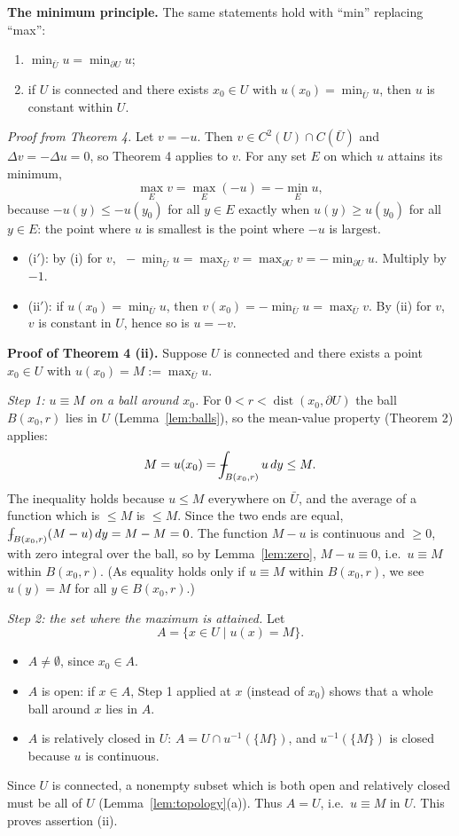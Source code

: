 \documentclass[11pt]{article}
\def\Xint#1{\mathchoice
  {\XXint\displaystyle\textstyle{#1}}%
  {\XXint\textstyle\scriptstyle{#1}}%
  {\XXint\scriptstyle\scriptscriptstyle{#1}}%
  {\XXint\scriptscriptstyle\scriptscriptstyle{#1}}%
  \!\int}
\def\XXint#1#2#3{{\setbox0=\hbox{$#1{#2#3}{\int}$}
  \vcenter{\hbox{$#2#3$}}\kern-.5\wd0}}
\def\fint{\Xint-}
\theoremstyle{plain}
\theoremstyle{definition}
\theoremstyle{remark}
\begin{document}
\textbf{The minimum principle.} The same statements hold with ``min'' replacing ``max'':
\begin{enumerate}
    \item[(i$'$)] $\displaystyle\min_{\bar U} u = \min_{\partial U} u$;
    \item[(ii$'$)] if $U$ is connected and there exists $x_0 \in U$ with $u(x_0) = \min_{\bar U} u$, then $u$ is constant within $U$.
\end{enumerate}
\emph{Proof from Theorem 4.} Let $v = -u$. Then $v \in C^2(U)\cap C(\bar U)$ and $\Delta v = -\Delta u = 0$, so Theorem 4 applies to $v$. For any set $E$ on which $u$ attains its minimum,
$$ \max_E v = \max_E(-u) = -\min_E u, $$
because $-u(y) \leq -u(y_0)$ for all $y \in E$ exactly when $u(y) \geq u(y_0)$ for all $y \in E$: the point where $u$ is smallest is the point where $-u$ is largest.
\begin{itemize}
    \item (i$'$): by (i) for $v$, $\;-\min_{\bar U} u = \max_{\bar U} v = \max_{\partial U} v = -\min_{\partial U} u$. Multiply by $-1$.
    \item (ii$'$): if $u(x_0) = \min_{\bar U} u$, then $v(x_0) = -\min_{\bar U} u = \max_{\bar U} v$. By (ii) for $v$, $v$ is constant in $U$, hence so is $u = -v$.
\end{itemize}

\textbf{Proof of Theorem 4 (ii).} Suppose $U$ is connected and there exists a point $x_0 \in U$ with $u(x_0) = M := \max_{\bar U} u$.

\emph{Step 1: $u \equiv M$ on a ball around $x_0$.} For $0 < r < \operatorname{dist}(x_0, \partial U)$ the ball $B(x_0,r)$ lies in $U$ (Lemma~\ref{lem:balls}), so the mean-value property (Theorem 2) applies:
$$ M = u(x_0) = \fint_{B(x_0,r)} u\, dy \leq M. $$
The inequality holds because $u \leq M$ everywhere on $\bar U$, and the average of a function which is $\leq M$ is $\leq M$. Since the two ends are equal, $\fint_{B(x_0,r)} (M - u)\, dy = M - M = 0$. The function $M - u$ is continuous and $\geq 0$, with zero integral over the ball, so by Lemma~\ref{lem:zero}, $M - u \equiv 0$, i.e.\ $u \equiv M$ within $B(x_0,r)$. (As equality holds only if $u \equiv M$ within $B(x_0,r)$, we see $u(y) = M$ for all $y \in B(x_0,r)$.)

\emph{Step 2: the set where the maximum is attained.} Let
$$ A = \{ x \in U \mid u(x) = M \}. $$
\begin{itemize}
    \item $A \neq \emptyset$, since $x_0 \in A$.
    \item $A$ is open: if $x \in A$, Step 1 applied at $x$ (instead of $x_0$) shows that a whole ball around $x$ lies in $A$.
    \item $A$ is relatively closed in $U$: $A = U \cap u^{-1}(\{M\})$, and $u^{-1}(\{M\})$ is closed because $u$ is continuous.
\end{itemize}
Since $U$ is connected, a nonempty subset which is both open and relatively closed must be all of $U$ (Lemma~\ref{lem:topology}(a)). Thus $A = U$, i.e.\ $u \equiv M$ in $U$. This proves assertion (ii).
\end{document}
